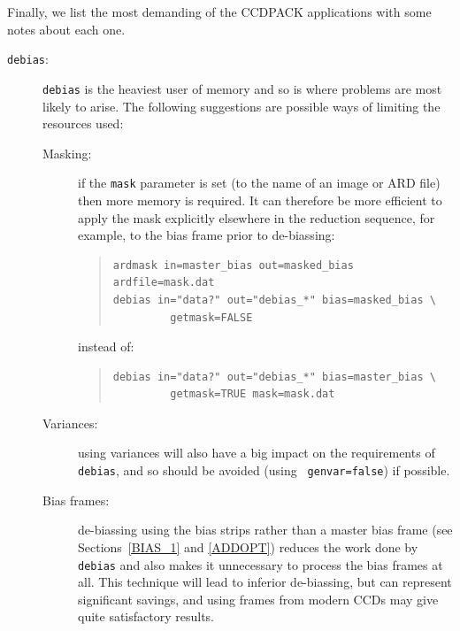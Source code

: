 \documentclass[twoside,11pt]{article}
\begin{document}
Finally, we list the most demanding of the CCDPACK applications with some
notes about each one.

\begin{description}

  \item[{\tt debias}:] {\tt debias} is the heaviest user of memory and so
   is where problems are most likely to arise.
   The following suggestions are possible ways of limiting the resources
   used:

  \begin{description}

    \item[Masking:] if the {\tt mask} parameter is set (to the name of an
     image or ARD file) then more memory is required.
     It can therefore be more efficient to apply the mask explicitly elsewhere
     in the reduction sequence, for example, to the bias frame prior to
     de-biassing:

    \begin{quote}
    \begin{verbatim}
ardmask in=master_bias out=masked_bias ardfile=mask.dat
debias in="data?" out="debias_*" bias=masked_bias \
         getmask=FALSE
\end{verbatim}
    \end{quote}

     instead of:

    \begin{quote}
    \begin{verbatim}
debias in="data?" out="debias_*" bias=master_bias \
         getmask=TRUE mask=mask.dat
\end{verbatim}
    \end{quote}

    \item[Variances:] using variances will also have a big impact on the
     requirements of {\tt debias}, and so should be avoided (using {\tt
     genvar=false}) if possible.

    \item[Bias frames:] de-biassing using the bias strips rather than
     a master bias frame (see Sections~\ref{BIAS_1} and \ref{ADDOPT})
     reduces the work done by {\tt debias} and also makes it unnecessary
     to process the bias frames at all.
     This technique will lead to inferior de-biassing, but can represent
     significant savings, and using frames from modern CCDs may give quite
     satisfactory results.

  \end{description}


\end{description}
\end{document}
